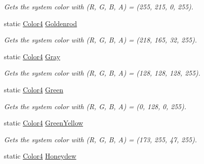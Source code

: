 \begin{DoxyCompactItemize}
\begin{DoxyCompactList}\small\item\em Gets the system color with (R, G, B, A) = (255, 215, 0, 255). \end{DoxyCompactList}\item 
static \hyperlink{struct_open_t_k_1_1_graphics_1_1_color4}{Color4} \hyperlink{struct_open_t_k_1_1_graphics_1_1_color4_a2fd0f77585749040dc451eb909ecce05}{Goldenrod}
\begin{DoxyCompactList}\small\item\em Gets the system color with (R, G, B, A) = (218, 165, 32, 255). \end{DoxyCompactList}\item 
static \hyperlink{struct_open_t_k_1_1_graphics_1_1_color4}{Color4} \hyperlink{struct_open_t_k_1_1_graphics_1_1_color4_ad926ba5fd3c7a1ba9af136499b06fce7}{Gray}
\begin{DoxyCompactList}\small\item\em Gets the system color with (R, G, B, A) = (128, 128, 128, 255). \end{DoxyCompactList}\item 
static \hyperlink{struct_open_t_k_1_1_graphics_1_1_color4}{Color4} \hyperlink{struct_open_t_k_1_1_graphics_1_1_color4_a6218d5e5a075de66b52fc35b7fb6a752}{Green}
\begin{DoxyCompactList}\small\item\em Gets the system color with (R, G, B, A) = (0, 128, 0, 255). \end{DoxyCompactList}\item 
static \hyperlink{struct_open_t_k_1_1_graphics_1_1_color4}{Color4} \hyperlink{struct_open_t_k_1_1_graphics_1_1_color4_a8ddea870315c44c91a088b15783591d8}{Green\-Yellow}
\begin{DoxyCompactList}\small\item\em Gets the system color with (R, G, B, A) = (173, 255, 47, 255). \end{DoxyCompactList}\item 
static \hyperlink{struct_open_t_k_1_1_graphics_1_1_color4}{Color4} \hyperlink{struct_open_t_k_1_1_graphics_1_1_color4_a97b0fc5cc68c8dd25e0939e6a3cacd88}{Honeydew}

\end{DoxyCompactItemize}
